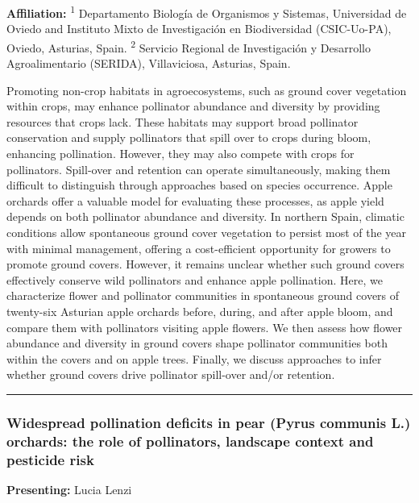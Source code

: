 \documentclass[
  letterpaper,
  DIV=11,
  numbers=noendperiod]{scrartcl}
\begin{document}
\textbf{Affiliation:} \textsuperscript{1} Departamento Biología de
Organismos y Sistemas, Universidad de Oviedo and Instituto Mixto de
Investigación en Biodiversidad (CSIC-Uo-PA), Oviedo, Asturias, Spain.
\textsuperscript{2} Servicio Regional de Investigación y Desarrollo
Agroalimentario (SERIDA), Villaviciosa, Asturias, Spain.

Promoting non-crop habitats in agroecosystems, such as ground cover
vegetation within crops, may enhance pollinator abundance and diversity
by providing resources that crops lack. These habitats may support broad
pollinator conservation and supply pollinators that spill over to crops
during bloom, enhancing pollination. However, they may also compete with
crops for pollinators. Spill-over and retention can operate
simultaneously, making them difficult to distinguish through approaches
based on species occurrence. Apple orchards offer a valuable model for
evaluating these processes, as apple yield depends on both pollinator
abundance and diversity. In northern Spain, climatic conditions allow
spontaneous ground cover vegetation to persist most of the year with
minimal management, offering a cost-efficient opportunity for growers to
promote ground covers. However, it remains unclear whether such ground
covers effectively conserve wild pollinators and enhance apple
pollination. Here, we characterize flower and pollinator communities in
spontaneous ground covers of twenty-six Asturian apple orchards before,
during, and after apple bloom, and compare them with pollinators
visiting apple flowers. We then assess how flower abundance and
diversity in ground covers shape pollinator communities both within the
covers and on apple trees. Finally, we discuss approaches to infer
whether ground covers drive pollinator spill-over and/or retention.

\begin{center}\rule{0.5\linewidth}{0.5pt}\end{center}

\subsubsection{Widespread pollination deficits in pear (Pyrus communis
L.) orchards: the role of pollinators, landscape context and pesticide
risk}\label{widespread-pollination-deficits-in-pear-pyrus-communis-l.-orchards-the-role-of-pollinators-landscape-context-and-pesticide-risk}

\textbf{Presenting:} Lucia Lenzi
\end{document}
